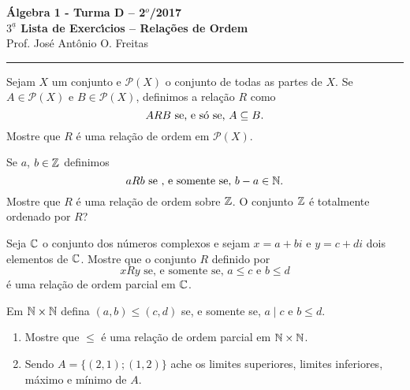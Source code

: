 \documentclass[12pt]{article}
\begin{document}


\begin{center}
{\Large\bf {\'A}lgebra 1 - Turma D -- 2$^{o}$/2017} \\ \vspace{9pt} {\large\bf
  $3^{\underline{a}}$ Lista de Exerc{\'\i}cios -- Rela\c{c}\~oes de Ordem}\\
\vspace{9pt} Prof. Jos{\'e} Ant{\^o}nio O. Freitas
\end{center}
\hrule

\vspace{.6cm}

\questao Sejam $X$ um conjunto e $\mathcal{P}(X)$ o conjunto de todas as partes de $X$. Se $A \in \mathcal{P}(X)$ e $B \in \mathcal{P}(X)$, definimos a relação $R$ como
\[
	ARB \mbox{ se, e só se, } A \subseteq B.
\]
Mostre que $R$ é uma relação de ordem em $\mathcal{P}(X)$.

\vesp

\questao Se $a$, $b \in \mathbb{Z}$ definimos
\[
	aRb \mbox{ se , e somente se, } b - a \in \mathbb{N}.
\]
Mostre que $R$ é uma relação de ordem sobre $\mathbb{Z}$. O conjunto $\mathbb{Z}$ é totalmente ordenado por $R$?

\vesp

\questao Seja $\mathbb{C}$ o conjunto dos números complexos e sejam $x = a + bi$ e $y = c + di$ dois elementos de $\mathbb{C}$.
Mostre que o conjunto $R$ definido por
\[
	xRy \mbox{ se, e somente se, } a \leqslant c \mbox{ e } b \leqslant d
\]
é uma relação de ordem parcial em $\mathbb{C}$.

\vesp

\questao Em $\mathbb{N} \times \mathbb{N}$ defina $(a,b) \leqslant (c, d)$ se, e somente se, $a \mid c$ e $b \leqslant d$.
\begin{enumerate}
	\item Mostre que $\leqslant$ é uma relação de ordem parcial em $\mathbb{N} \times \mathbb{N}$.
	\item Sendo $A = \{(2,1);(1,2)\}$ ache os limites superiores, limites inferiores, máximo e mínimo de $A$.
\end{enumerate}

\vesp
\end{document}
